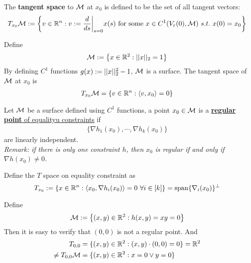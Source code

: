 \documentclass{article}
\begin{document}
   	\begin{definition}
   		The \textbf{tangent space} to $\mathcal{{M}}$ at $x_0$ is defined to be the set of all tangent vectors:
   		\begin{align}
   			T_{x_0} \mathcal{{M}} := \left \{
   			v \in \mathbb{R}^n
   			:
   			v := \frac{d}{ds} \bigg \vert_{s=0} x(s) \text{{ for some }} x \in C^1(V_\varepsilon(0), \mathcal{{M}})\ s.t.\ x(0) = x_0
   			\right \}
   		\end{align}
   	\end{definition}
   	
   	\begin{example}
   		Define 
   		\begin{align}
   			\mathcal{{M}} := \left\{x \in \mathbb{R}^2: \vert \vert {x} \vert \vert_2 = 1 \right\}
   		\end{align}
   		By defining $C^1$ functions $g(x) := \vert \vert {x} \vert \vert^2_2  - 1$, $\mathcal{{M}}$ is a surface. The tangent space of $\mathcal{{M}}$ at $x_0$ is
   		\begin{align}
   			T_{x_0} \mathcal{{M}} = \left \{
   			v \in \mathbb{R}^n:
   			\langle {v}, {x_0} \rangle = 0
   			\right \}
   		\end{align}
   	\end{example}
   	
   	\begin{definition}
   		Let $\mathcal{{M}}$ be a surface defined using $C^1$ functions, a point $x_0 \in \mathcal{{M}}$ is a \ul{\textbf{regular point} of equalityu constraints} if 
   		\begin{align}
   			\{\nabla h_1(x_0), \cdots, \nabla h_k(x_0)\}
   		\end{align}
   		are linearly independent. \\
   		\emph{Remark: if there is only one constraint $h$, then $x_0$ is regular if and only if $\nabla h(x_0) \neq 0$.}
   	\end{definition}
   	
   	\begin{notation}
   		Define the $T$ space on equality constraint as
   		\begin{align}
   			T_{x_0} := \{x \in \R^n: \inner{x_0}{\nabla h_i(x_0)} = 0\ \forall i \in [k]\} = \tx{span} \{\nabla_i(x_0)\}^\perp
   		\end{align}
   	\end{notation}
   	
   	\begin{example}
   		Define
   		\begin{align}
   			\mathcal{{M}} := \left \{
   			(x, y) \in \mathbb{R}^2:
   			h(x,y) = xy = 0
   			\right \}
   		\end{align}
   		Then it is easy to verify that $(0,0)$ is not a regular point. And
   		\begin{align}
   			T_{0,0} &= \{(x, y) \in \mathbb{R}^2: (x, y) \cdot (0,0) = 0\} = \mathbb{R}^2 \\
   			\neq T_{0,0}\mathcal{{M}} &= \{(x, y) \in \mathbb{R}^2: x = 0 \lor y = 0\}
   		\end{align}
   	\end{example}
   	
\end{document}
